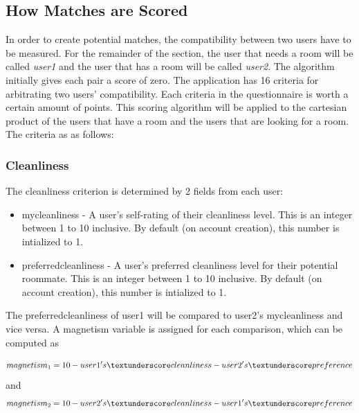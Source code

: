\documentclass[journal]{./IEEE/IEEEtran}
\begin{document}
\subsection{How Matches are Scored}
In order to create potential matches, the compatibility between two users have to be measured. For the remainder of the
section, the user that needs a room will be called \textit{user1} and the user that has a room will be called
\textit{user2}. The algorithm initially gives each pair a score of zero. The application has 16 criteria for arbitrating
two users' compatibility. Each criteria in the questionnaire is worth a certain amount of points.  This scoring
algorithm will be applied to the cartesian product of the users that have a room and the users that are looking for a
room. The criteria as as follows:

    \subsubsection{Cleanliness}
        The cleanliness criterion is determined by 2 fields from each user:
        \begin{itemize}
                \item my\textunderscore cleanliness - A user's self-rating of their cleanliness level. This is an
                    integer between 1 to 10 inclusive. By default (on account creation), this number is intialized to 1.
                \item preferred\textunderscore cleanliness - A user's preferred cleanliness level for their
                    potential roommate. This is an integer between 1 to 10 inclusive. By default (on account creation),
                    this number is intialized to 1.

        \end{itemize}

        The preferred\textunderscore cleanliness of user1 will be compared to user2's my\textunderscore cleanliness and
        vice versa. A magnetism variable is assigned for each comparison, which can be computed as

        \begin{equation}
            magnetism_1 = 10-user1's\textunderscore cleanliness - user2's\textunderscore preference
        \end{equation}
        and
        \begin{equation}
            magnetism_2 = 10-user2's\textunderscore cleanliness - user1's\textunderscore preference
        \end{equation}
\end{document}
